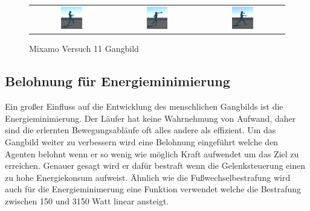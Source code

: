 \begin{figure}[H]
\begin{tabular}{ccc}
    \includegraphics[width=0.27\textwidth]{img/charakter_mixamo_laufen4}  & \includegraphics[width=0.27\textwidth]{img/charakter_mixamo_laufen5}  & \includegraphics[width=0.27\textwidth]{img/charakter_mixamo_laufen6} \\
  \end{tabular}
  \caption{Mixamo Versuch 11 Gangbild}
  \label{fig:mixamo_versuch11_gangbild}
\end{figure}

\subsection{Belohnung für Energieminimierung}
Ein großer Einfluss auf die Entwicklung des menschlichen Gangbilds ist die Energieminimierung. Der Läufer hat keine Wahrnehmung von Aufwand, daher sind die erlernten Bewegungsabläufe oft alles andere als effizient. Um das Gangbild weiter zu verbessern wird eine Belohnung eingeführt welche den Agenten belohnt wenn er so wenig wie möglich Kraft aufwendet um das Ziel zu erreichen. Genauer gesagt wird er dafür bestraft wenn die Gelenksteuerung einen zu hohe Energiekonsum aufweist. Ähnlich wie die Fußwechselbestrafung wird auch für die Energieminimerung eine Funktion verwendet welche die Bestrafung zwischen 150 und 3150 Watt linear ansteigt.

